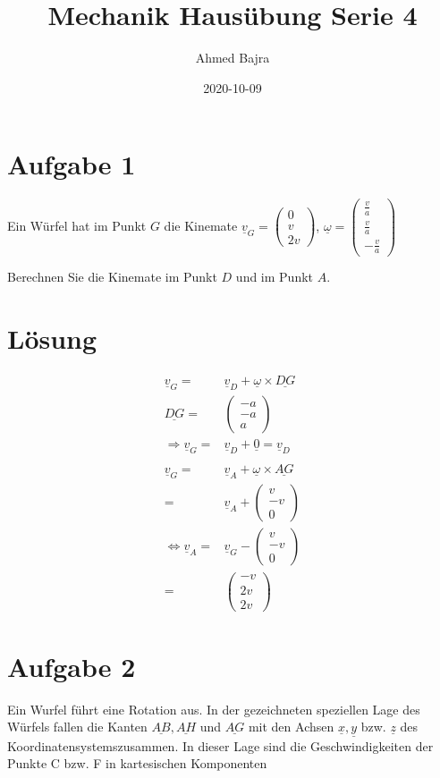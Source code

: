 \documentclass{article}
\title{Mechanik Hausübung Serie 4}
\author{Ahmed Bajra}
\date{2020-10-09}
\newcommand{\ul}[1]{\underline{#1}}
\begin{document}
	\maketitle
	
	\section{Aufgabe 1}
	Ein Würfel hat im Punkt $G$ die Kinemate $\ul{v}_G= \begin{pmatrix}0\\ v \\2v\end{pmatrix}$, $\ul{\omega}=\begin{pmatrix}\frac{v}a\\\frac{v}a\\-\frac{v}a\end{pmatrix}$
	
	Berechnen Sie die Kinemate im Punkt $D$ und im Punkt $A$.

	\section{Lösung}

	\begin{align*}
		\ul{v}_G=&\ul{v}_D + \ul{\omega}\times\ul{DG}\\
		\ul{DG}=&\begin{pmatrix}-a\\-a\\a\end{pmatrix}\\
		\Rightarrow \ul{v}_G =& \ul{v}_D + \ul0 = \ul{v}_D\\\\
		\ul{v}_G =& \ul{v}_A + \ul\omega\times\ul{AG}\\
		=& \ul{v}_A + \begin{pmatrix}v\\-v\\0\end{pmatrix}\\
		\Leftrightarrow \ul{v}_A =& \ul{v}_G - \begin{pmatrix}v\\-v\\0\end{pmatrix}\\
		=& \begin{pmatrix}-v\\2v\\2v\end{pmatrix}
	\end{align*}

	\section{Aufgabe 2}
	Ein Wurfel führt eine Rotation aus. In der gezeichneten speziellen Lage des 
	Würfels fallen die Kanten $\ul{AB}, \ul{AH}$ und $\ul{AG}$ mit den Achsen $\ul{x}, \ul{y}$ bzw. $\ul{z}$ 
	des Koordinatensystemszusammen. In dieser Lage sind die Geschwindigkeiten der Punkte C bzw. F in kartesischen Komponenten
\end{document}
